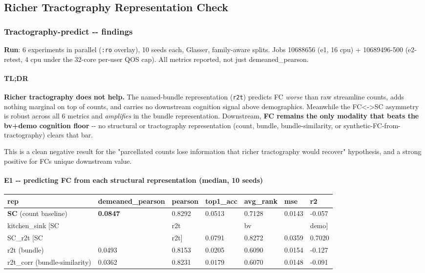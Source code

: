 \subsection{Richer Tractography Representation Check}\label{richer-tractography-representation-check}

\subsubsection{Tractography-predict -\/- findings}\label{tractography-predict----findings}

\textbf{Run}: 6 experiments in parallel (\texttt{:ro} overlay), 10 seeds each, Glasser, family-aware splits. Jobs 10688656 (e1, 16 cpu) + 10689496-500 (e2-retest, 4 cpu under the 32-core per-user QOS cap). All metrics reported, not just demeaned\_pearson.

\paragraph{TL;DR}\label{tldr-3}

\textbf{Richer tractography does not help.} The named-bundle representation (\texttt{r2t}) predicts FC \emph{worse} than raw streamline counts, adds nothing marginal on top of counts, and carries no downstream cognition signal above demographics. Meanwhile the FC\textless-\textgreater SC asymmetry is robust across all 6 metrics and \emph{amplifies} in the bundle representation. Downstream, \textbf{FC remains the only modality that beats the bv+demo cognition floor} -\/- no structural or tractography representation (count, bundle, bundle-similarity, or synthetic-FC-from-tractography) clears that bar.

This is a clean negative result for the "parcellated counts lose information that richer tractography would recover" hypothesis, and a strong positive for FC\textquotesingle s unique downstream value.

\paragraph{E1 -\/- predicting FC from each structural representation (median, 10 seeds)}\label{e1----predicting-fc-from-each-structural-representation-median-10-seeds}

{\def\LTcaptype{none} %
\begin{longtable}[]{@{}lllllll@{}}
\toprule\noalign{}
rep & demeaned\_pearson & pearson & top1\_acc & avg\_rank & mse & r2 \\
\midrule\noalign{}
\endhead
\bottomrule\noalign{}
\endlastfoot
\textbf{SC} (count baseline) & \textbf{0.0847} & 0.8292 & 0.0513 & 0.7128 & 0.0143 & -0.057 \\
kitchen\_sink {[}SC & & r2t & & bv & & demo{]} \\
SC\_r2t {[}SC & & r2t{]} & 0.0791 & 0.8272 & 0.0359 & 0.7020 \\
r2t (bundle) & 0.0493 & 0.8153 & 0.0205 & 0.6090 & 0.0154 & -0.127 \\
r2t\_corr (bundle-similarity) & 0.0362 & 0.8231 & 0.0179 & 0.6070 & 0.0148 & -0.091 \\
\end{longtable}
}

